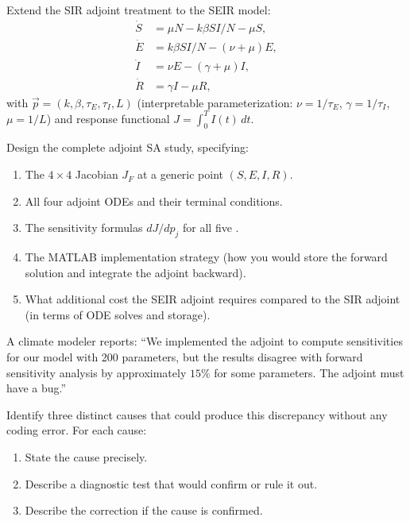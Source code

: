 \begin{exercise}[\bloom{L5}]
\label{ex:ch6:SEIR}
Extend the SIR adjoint treatment to the SEIR model:
\begin{align*}
  \dot{S} &= \mu N - k\beta SI/N - \mu S, \\
  \dot{E} &= k\beta SI/N - (\nu + \mu)E, \\
  \dot{I} &= \nu E - (\gamma + \mu)I, \\
  \dot{R} &= \gamma I - \mu R,
\end{align*}
with \POIs $\vec{p} = (k, \beta, \tau_E, \tau_I, L)$
(interpretable parameterization: $\nu = 1/\tau_E$, $\gamma = 1/\tau_I$,
$\mu = 1/L$) and response functional $J = \int_0^T I(t)\,dt$.

Design the complete adjoint SA study, specifying:
\begin{enumerate}[label=(\alph*)]
  \item The $4\times4$ Jacobian $J_F$ at a generic point
        $(S, E, I, R)$.
  \item All four adjoint ODEs and their terminal conditions.
  \item The sensitivity formulas $dJ/dp_j$ for all five \POIs.
  \item The MATLAB implementation strategy (how you would store
        the forward solution and integrate the adjoint backward).
  \item What additional cost the SEIR adjoint requires compared
        to the SIR adjoint (in terms of ODE solves and storage).
\end{enumerate}
\end{exercise}

\begin{exercise}[\bloom{L6}]
\label{ex:ch6:disagreement}
A climate modeler reports: ``We implemented the adjoint to compute
sensitivities for our model with 200 parameters, but the results
disagree with forward sensitivity analysis by approximately $15\%$
for some parameters. The adjoint must have a bug.''

Identify three distinct causes that could produce this discrepancy
without any coding error. For each cause:
\begin{enumerate}[label=(\alph*)]
  \item State the cause precisely.
  \item Describe a diagnostic test that would confirm or rule it out.
  \item Describe the correction if the cause is confirmed.
\end{enumerate}
\end{exercise}


